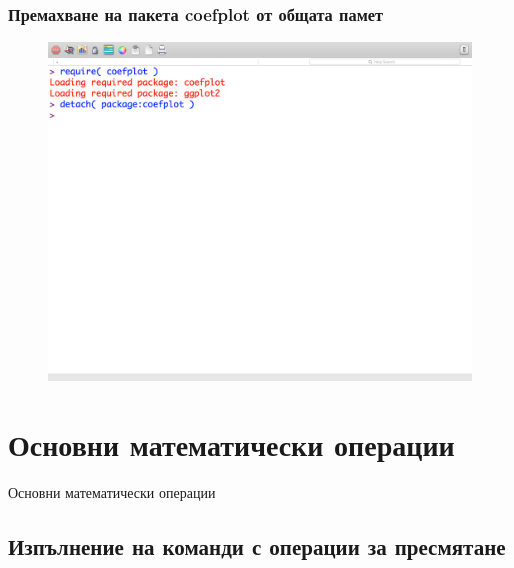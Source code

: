 \documentclass{beamer}
\begin{document}
\begin{frame}
\frametitle{Премахване на пакета coefplot от общата памет}
\begin{figure}[]\includegraphics[width=\textwidth,height=0.75\textheight]{pic0019}\end{figure}
\end{frame}

\section{Основни математически операции}

\begin{frame}
\center \huge{Основни математически операции}
\end{frame}

\subsection{Изпълнение на команди с операции за пресмятане}
\end{document}
